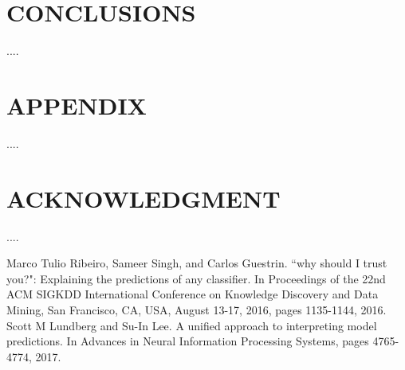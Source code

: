 \documentclass[letterpaper, 10 pt, conference]{ieeeconf}  %
\begin{document}
\section{CONCLUSIONS}

....

\addtolength{\textheight}{-12cm}   %







\section*{APPENDIX}

....

\section*{ACKNOWLEDGMENT}

....



\begin{thebibliography}{99}

 Marco Tulio Ribeiro, Sameer Singh, and Carlos Guestrin. ``why should I trust you?": Explaining the predictions of any classifier. In Proceedings of the 22nd ACM SIGKDD International Conference on Knowledge Discovery and Data Mining, San Francisco, CA, USA, August 13-17, 2016, pages 1135-1144, 2016.
 Scott M Lundberg and Su-In Lee. A unified approach to interpreting model predictions. In Advances in Neural Information Processing Systems, pages 4765-4774, 2017.
\end{thebibliography}
\end{document}
